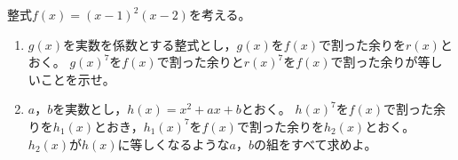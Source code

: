 \documentclass[../../main.tex]{subfiles}
\begin{document}
整式$f(x)={(x-1)}^2(x-2)$を考える。
\begin{enumerate}
  \item$g(x)$を実数を係数とする整式とし，$g(x)$を$f(x)$で割った余りを$r(x)$とおく。
    ${g(x)}^7$を$f(x)$で割った余りと${r(x)}^7$を$f(x)$で割った余りが等しいことを示せ。
  \item$a$，$b$を実数とし，$h(x)=x^2+ax+b$とおく。
    ${h(x)}^7$を$f(x)$で割った余りを$h_1(x)$とおき，${h_1(x)}^7$を$f(x)$で割った余りを$h_2(x)$とおく。
    $h_2(x)$が$h(x)$に等しくなるような$a$，$b$の組をすべて求めよ。
\end{enumerate}
\end{document}

